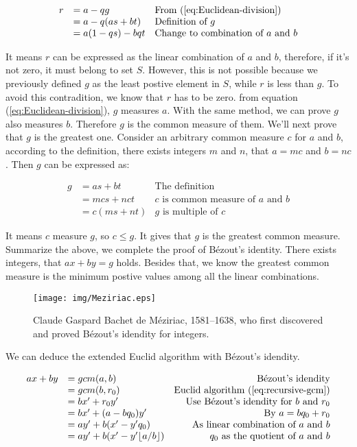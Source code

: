 \documentclass{article}
\begin{document}
\[
\begin{array}{rll}
r & = a - qg & \text{From (\ref{eq:Euclidean-division})} \\
  & = a - q(as + bt) & \text{Definition of}\ g \\
  & = a(1 - qs) - bqt & \text{Change to combination of}\ a\ \text{and}\ b
\end{array}
\]

It means $r$ can be expressed as the linear combination of $a$ and $b$, therefore, if it's not zero, it must belong to set $S$. However, this is not possible because we previously defined $g$ as the least postive element in $S$, while $r$ is less than $g$. To avoid this contradition, we know that $r$ has to be zero. from equation (\ref{eq:Euclidean-division}), $g$ measures $a$. With the same method, we can prove $g$ also measures $b$. Therefore $g$ is the common measure of them. We'll next prove that $g$ is the greatest one. Consider an arbitrary common measure $c$ for $a$ and $b$, according to the definition, there exists integers $m$ and $n$, that $a = mc$ and $b = nc$. Then $g$ can be expressed as:

\[
\begin{array}{rll}
g & = as + bt & \text{The definition} \\
  & = mcs + nct & \text{$c$ is common measure of $a$ and $b$} \\
  & = c(ms + nt) & \text{$g$ is multiple of $c$}
\end{array}
\]

It means $c$ measure $g$, so $c \leq g$. It gives that $g$ is the greatest common measure. Summarize the above, we complete the proof of Bézout's identity. There exists integers, that $ax + by = g$ holds. Besides that, we know the greatest common measure is the minimum postive values among all the linear combinations.

\begin{figure}[htbp]
 \centering
 \texttt{[image: img/Meziriac.eps]}
 \captionsetup{labelformat=empty}
 \caption{Claude Gaspard Bachet de Méziriac, 1581–1638, who first discovered and proved Bézout's idendity for integers.}
 \label{fig:Meziriac}
\end{figure}

We can deduce the extended Euclid algorithm with Bézout's idendity.

\[
\begin{array}{rlr}
ax + by & = gcm(a, b) & \text{Bézout's idendity} \\
        & = gcm(b, r_0) & \text{Euclid algorithm (\ref{eq:recursive-gcm})} \\
        & = bx' + r_0 y' & \text{Use Bézout's idendity for $b$ and $r_0$} \\
        & = bx' + (a - bq_0)y' & \text{By $a = b q_0 + r_0$} \\
        & = ay' + b(x' - y'q_0) & \text{As linear combination of $a$ and $b$} \\
        & = ay' + b(x' - y' \lfloor a / b \rfloor) & \text{$q_0$ as the quotient of $a$ and $b$}
\end{array}
\]
\end{document}
